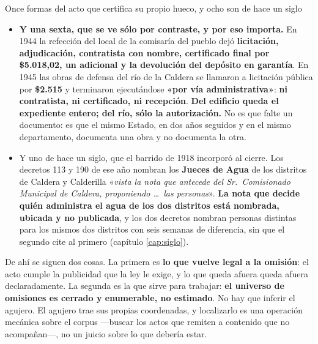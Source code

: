 \begin{ficha}{Once formas del acto que certifica su propio hueco, y ocho son de hace un siglo}
\begin{itemize}[leftmargin=*,nosep]
{efecto y no el acto.} El decreto que aprueba el presupuesto municipal de ese año dice
«\textit{visto este expediente en el que el señor \textbf{Interventor de la comuna de la Caldera}
eleva}» el proyecto de ordenanza. \textbf{Hay un interventor ejerciendo, y ningún acto de los
treinta y dos años leídos dice cuándo se lo designó}; quién era se sabe recién en octubre de 1945,
cuando un decreto acepta la renuncia de Augusto Regis al cargo; la intervención sólo termina en
julio de 1946, cuando un decreto la da por concluida. \textbf{Se puede saber que el gobierno de
este departamento estuvo intervenido más de dos años, y no se puede saber desde cuándo con más precisión que entre junio de 1943 y abril de 1944}
(capítulo \ref{cap:siglo}).
\item \textbf{Y una sexta, que se ve sólo por contraste, y por eso importa.} En 1944 la refección
del local de la comisaría del pueblo dejó \textbf{licitación, adjudicación, contratista con
nombre, certificado final por \$5.018,02, un adicional y la devolución del depósito en garantía}.
En 1945 las obras de defensa del río de la Caldera se llamaron a licitación pública por
\textbf{\$2.515} y terminaron ejecutándose \textbf{«por vía administrativa»}: \textbf{ni
contratista, ni certificado, ni recepción}. \textbf{Del edificio queda el expediente entero; del
río, sólo la autorización.} No es que falte un documento: es que el mismo Estado, en dos años seguidos y
en el mismo departamento, documenta una obra y no documenta la otra.
\item Y uno de hace un siglo, que el barrido de 1918 incorporó al cierre. Los decretos 113 y
190 de ese año nombran los \textbf{Jueces de Agua} de los distritos de Caldera y Calderilla
«\textit{vista la nota que antecede del Sr.\ Comisionado Municipal de Caldera, proponiendo
\ldots\ las personas}». \textbf{La nota que decide quién administra el agua de los dos
distritos está nombrada, ubicada y no publicada}, y los dos decretos nombran personas distintas
para los mismos dos distritos con seis semanas de diferencia, sin que el segundo cite al primero
(capítulo \ref{cap:siglo}).
\end{itemize}
\end{ficha}

De ahí se siguen dos cosas. La primera es \textbf{lo que vuelve legal a la omisión}: el acto
cumple la publicidad que la ley le exige, y lo que queda afuera queda afuera declaradamente. La
segunda es la que sirve para trabajar: \textbf{el universo de omisiones es cerrado y
enumerable, no estimado}. No hay que inferir el agujero. El agujero trae sus propias
coordenadas, y localizarlo es una operación mecánica sobre el corpus ---buscar los actos que
remiten a contenido que no acompañan---, no un juicio sobre lo que debería estar.

